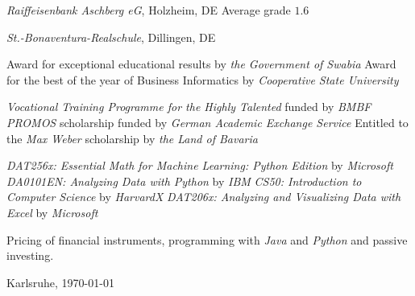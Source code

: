 \documentclass[10pt]{article}
\begin{document}
 \vspace{0.01in} 
\newline \noindent \emph{Raiffeisenbank Aschberg eG}, Holzheim, DE
\newline\noindent Average grade $1.6$
\medskip

 \vspace{0.01in} 
\newline \noindent \emph{St.-Bonaventura-Realschule}, Dillingen, DE
\medskip

\medskip
{}
\noindent Award for exceptional educational results by \textit{the Government of Swabia} 
\medskip
\newline\noindent Award for the best of the year of Business Informatics by \textit{Cooperative State University} 
\medskip

\medskip
{}
\noindent \textit{Vocational Training Programme for the Highly Talented} funded by \textit{BMBF} 
\medskip
\newline\noindent \textit{PROMOS} scholarship funded by \textit{German Academic Exchange Service} 
\medskip
\newline\noindent Entitled to the \textit{Max Weber} scholarship by \textit{the Land of Bavaria} 
\medskip

\medskip
{}
\noindent \textit{DAT256x: Essential Math for Machine Learning: Python Edition} by \textit{Microsoft} 
\medskip
\newline\noindent \textit{DA0101EN: Analyzing Data with Python} by \textit{IBM} 
\medskip
\newline\noindent \textit{CS50: Introduction to Computer Science} by \textit{HarvardX} 
\medskip
\newline\noindent \textit{DAT206x: Analyzing and Visualizing Data with Excel} by \textit{Microsoft} 
\medskip

\medskip
{}
\noindent Pricing of financial instruments, programming with \textit{Java} and \textit{Python} and passive investing.
\medskip
\newline\noindent
\bigskip

\bigskip
\noindent Karlsruhe, \today
\medskip
\end{document}
